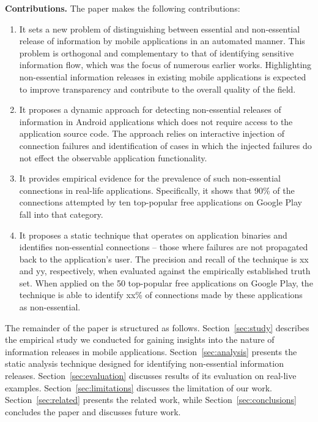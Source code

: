

\vspace{0.1in}
\noindent 
{\bf Contributions.}
The paper makes the following contributions:
\begin{enumerate}
\item It sets a new problem of distinguishing between essential and non-essential release of information by mobile applications in an automated manner. This problem is orthogonal and complementary to that of identifying sensitive information flow, which was the focus of numerous earlier works. 
Highlighting non-essential information releases in existing mobile applications is expected to improve transparency and contribute to the overall quality of the field. 
\item It proposes a dynamic approach for detecting non-essential releases of information in Android applications which does not require access to the application source code. 
The approach relies on interactive injection of connection failures and identification of cases in which the injected failures do not effect the observable application functionality. 
\item It provides empirical evidence for the prevalence of such non-essential connections in real-life applications. Specifically, it shows that 90\% of the connections attempted by ten top-popular free applications on Google Play fall into that category.    
\item It proposes a static technique that operates on application binaries and identifies non-essential connections -- those where failures are not propagated back to the application's user. The precision and recall of the technique is xx and yy, respectively, when evaluated against the empirically established truth set. 
When applied on the 50 top-popular free applications on Google Play, the technique is able to identify xx\% of connections made by these applications as non-essential.
\end{enumerate}

The remainder of the paper is structured as follows. Section~\ref{sec:study} describes the empirical study we conducted for gaining insights into the nature of information releases in mobile applications. Section~\ref{sec:analysis} presents the static analysis technique designed for identifying non-essential information releases. 
Section~\ref{sec:evaluation} discusses results of its evaluation on real-live examples. Section~\ref{sec:limitations} discusses the limitation of our work. Section~\ref{sec:related} presents the related work, while Section~\ref{sec:conclusions} concludes the paper and discusses future work. 



